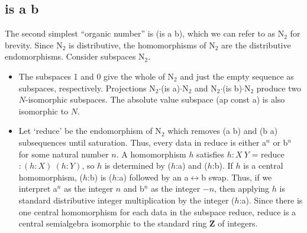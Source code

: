 \documentclass[11pt]{article}
\begin{document}
\subsection{is a b} 

The second simplest ``organic number'' is (is a b), which we can refer to as N$_2$ for brevity.  Since N$_2$ is distributive, the homomorphisms of N$_2$ 
are the distributive endomorphisms.  Consider subspaces N$_2$.  

\begin{itemize}
\item{The subspaces 1 and 0 give the whole of N$_2$ and just the empty sequence as subspaces, respectively.  
Projections N$_2$$\cdot$(is a)$\cdot$N$_2$ and N$_2$$\cdot$(is b)$\cdot$N$_2$ produce two $N$-isomorphic subspaces. The absolute value 
subspace (ap const a) is also isomorphic to $N$.}

\item{Let `reduce' be the endomorphism of N$_2$ which removes (a b) and (b a) subsequences until saturation.  Thus, every data in reduce
is either a$^n$ or b$^n$ for some natural number $n$.  A homomorphism $h$ satisfies $h:X\ Y$ = reduce $:(h:X)\ (h:Y)$, so 
$h$ is determined by ($h$:a) and ($h$:b).  If $h$ is a central homomorphism, ($h$:b) is ($h$:a) followed by an 
a$\leftrightarrow$b swap.  Thus, if we interpret a$^n$ as the integer $n$ and b$^n$ as the integer $-n$, then applying $h$ 
is standard distributive integer multiplication by the integer ($h$:a).  Since there is one central homomorphism for each data in the subspace reduce, 
reduce is a central semialgebra isomorphic to the standard ring $\mathbf Z$ of integers.}


\end{itemize}
\end{document}
